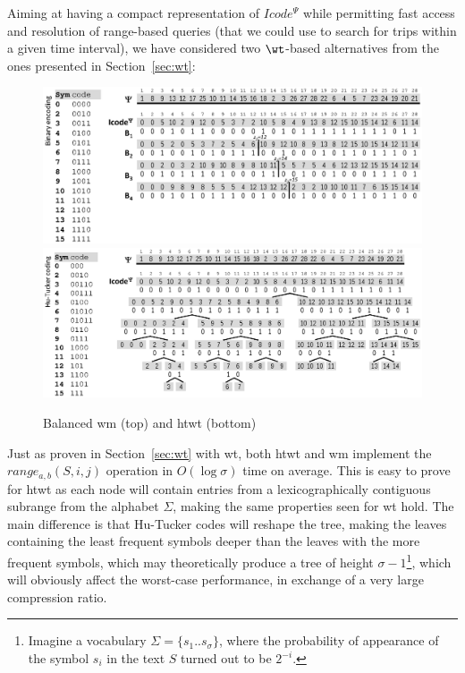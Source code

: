 Aiming at having a compact representation of $Icode^{\Psi}$ while permitting fast 
access and resolution of range-based queries (that we could use to search for trips within 
a given time interval), we have considered two $\wt$-based alternatives from the ones 
presented in Section~\ref{sec:wt}:

\begin{figure}[htb]
	\begin{center}
		{\includegraphics[width=1.0\textwidth]{figures/wma.eps}}
		{\includegraphics[width=1.0\textwidth]{figures/wta.eps}}
	\end{center}
	\caption{Balanced \acrlong{wm} (top) and \acrlong{htwt} (bottom)}
	\label{fig:wtwm}
\end{figure}


Just as proven in Section~\ref{sec:wt} with \gls{wt}, both \gls{htwt} and \gls{wm} implement the $range_{a,b}(S,i,j)$ operation in $O(\log\sigma)$ time on average. This is easy to prove for \gls{htwt} as each node will contain entries from a lexicographically contiguous subrange from the alphabet $\Sigma$, making the same properties seen for \gls{wt} hold. The main difference is that Hu-Tucker codes will reshape the tree, making the leaves containing the least frequent symbols deeper than the leaves with the more frequent symbols, which may theoretically produce a tree of height $\sigma-1$\footnote{Imagine a vocabulary $\Sigma=\{s_1..s_\sigma\}$, where the probability of appearance of the symbol $s_i$ in the text $S$ turned out to be $2^{-i}$.}, which will obviously affect the worst-case performance, in exchange of a very large compression ratio.

